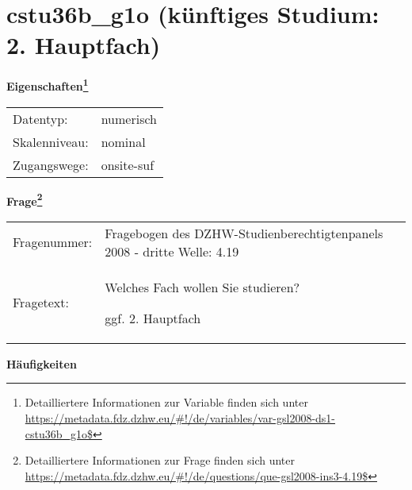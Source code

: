 
    \setcounter{footnote}{0}

    \vspace*{-1.8cm}
	\section{cstu36b\_g1o (künftiges Studium: 2. Hauptfach)}
	\label{section:cstu36b_g1o}



    \vspace*{0.5cm}
    \noindent\textbf{Eigenschaften\footnote{Detailliertere Informationen zur Variable finden sich unter
		\url{https://metadata.fdz.dzhw.eu/\#!/de/variables/var-gsl2008-ds1-cstu36b_g1o$}}}\\
	\begin{tabularx}{\hsize}{@{}lX}
	Datentyp: & numerisch \\
	Skalenniveau: & nominal \\
	Zugangswege: &
	  onsite-suf
 \\
    \end{tabularx}



				\vspace*{0.5cm}
                \noindent\textbf{Frage\footnote{Detailliertere Informationen zur Frage finden sich unter
		              \url{https://metadata.fdz.dzhw.eu/\#!/de/questions/que-gsl2008-ins3-4.19$}}}\\
				\begin{tabularx}{\hsize}{@{}lX}
					Fragenummer: &
					  Fragebogen des DZHW-Studienberechtigtenpanels 2008 - dritte Welle:
					  4.19
 \\
					Fragetext: & Welches Fach wollen Sie studieren?\par  ggf. 2. Hauptfach \\
				\end{tabularx}





        		\vspace*{0.5cm}
                \noindent\textbf{Häufigkeiten}

